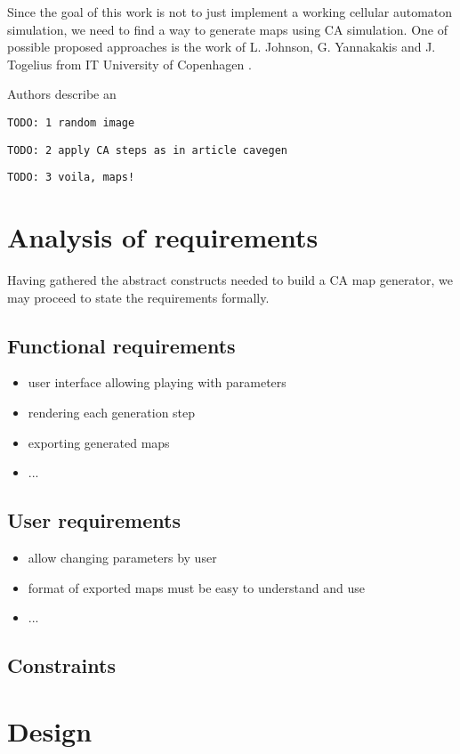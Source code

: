 \documentclass[12pt]{report}
\newcommand{\todo}[1]{}
\renewcommand{\todo}[1]{{\color{red} \par \noindent \footnotesize \texttt{TODO: {#1} }}}
\begin{document}
Since the goal of this work is not to just implement a working cellular automaton simulation, we need to find a way to generate maps using CA simulation. One of possible proposed approaches is the work of L. Johnson, G. Yannakakis and J. Togelius from IT University of Copenhagen \autocite{johnson2010cellular}. 

Authors describe an 


\todo{1 random image}
\todo{2 apply CA steps as in article cavegen}
\todo{3 voila, maps!}



\section{Analysis of requirements}

Having gathered the abstract constructs needed to build a CA map generator, we may proceed to state the requirements formally.

\subsection{Functional requirements}

\begin{itemize}
	\item user interface allowing playing with parameters
	\item rendering each generation step
	\item exporting generated maps
	\item ...
\end{itemize}

\subsection{User requirements}

\begin{itemize}
	\item allow changing parameters by user
	\item format of exported maps must be easy to understand and use
	\item ...
\end{itemize}

\subsection{Constraints}


\section{Design}
\end{document}
